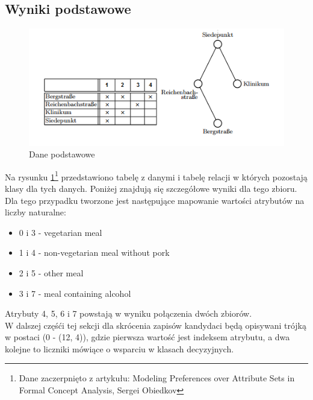 \documentclass[a4paper,12pt]{article}
\begin{document}
\subsection{Wyniki podstawowe}

\begin{figure}[h!]
\begin{center}
\includegraphics[width=\textwidth]{img/dane.png}
\caption{Dane podstawowe}
\label{dane_podstawowe}
\end{center}
\end{figure}

Na rysunku \ref{dane_podstawowe}\footnote{Dane zaczerpnięto z artykułu: Modeling Preferences over Attribute Sets in
Formal Concept Analysis, Sergei Obiedkov} przedstawiono tabelę z danymi i tabelę relacji w których pozostają klasy dla tych danych. Poniżej znajdują się szczegółowe wyniki dla tego zbioru.\\

Dla tego przypadku tworzone jest następujące mapowanie wartości atrybutów na liczby naturalne:\\

\begin{itemize}
\item 0 i 3 - vegetarian meal
\item 1 i 4 - non-vegetarian meal without pork
\item 2 i 5 - other meal
\item 3 i 7 - meal containing alcohol
\end{itemize}

Atrybuty 4, 5, 6 i 7 powstają w wyniku połączenia dwóch zbiorów.\\

W dalszej częśći tej sekcji dla skrócenia zapisów kandydaci będą opisywani trójką w postaci (0 - (12, 4)), gdzie pierwsza wartość jest indeksem atrybutu, a dwa kolejne to liczniki mówiące o wsparciu w klasach decyzyjnych.
\end{document}
